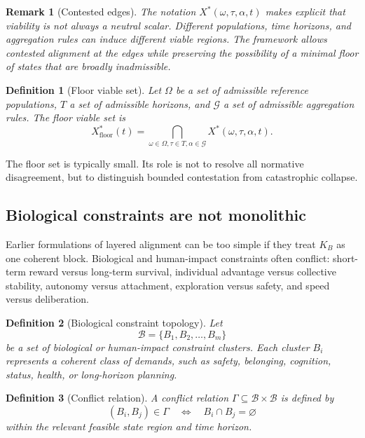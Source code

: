 \documentclass[11pt]{article}
\newtheorem{definition}{Definition}[section]
\newtheorem{remark}{Remark}[section]
\newcommand{\KB}{K_B}
\newcommand{\Xstar}{X^{\ast}}
\begin{document}
\begin{remark}[Contested edges]
The notation \(\Xstar(\omega,\tau,\alpha,t)\) makes explicit that viability is not always a neutral scalar. Different populations, time horizons, and aggregation rules can induce different viable regions. The framework allows contested alignment at the edges while preserving the possibility of a minimal floor of states that are broadly inadmissible.
\end{remark}

\begin{definition}[Floor viable set]
Let \(\Omega\) be a set of admissible reference populations, \(T\) a set of admissible horizons, and \(\mathcal{G}\) a set of admissible aggregation rules. The floor viable set is
\[
\Xstar_{\mathrm{floor}}(t) = \bigcap_{\omega\in\Omega,\tau\in T,\alpha\in\mathcal{G}} \Xstar(\omega,\tau,\alpha,t).
\]
\end{definition}

The floor set is typically small. Its role is not to resolve all normative disagreement, but to distinguish bounded contestation from catastrophic collapse.

\subsection{Biological constraints are not monolithic}

Earlier formulations of layered alignment can be too simple if they treat \(\KB\) as one coherent block. Biological and human-impact constraints often conflict: short-term reward versus long-term survival, individual advantage versus collective stability, autonomy versus attachment, exploration versus safety, and speed versus deliberation.

\begin{definition}[Biological constraint topology]
Let
\[
\mathcal{B}=\{B_1,B_2,\ldots,B_m\}
\]
be a set of biological or human-impact constraint clusters. Each cluster \(B_i\) represents a coherent class of demands, such as safety, belonging, cognition, status, health, or long-horizon planning.
\end{definition}

\begin{definition}[Conflict relation]
A conflict relation \(\Gamma\subseteq\mathcal{B}\times\mathcal{B}\) is defined by
\[
(B_i,B_j)\in\Gamma \quad \Longleftrightarrow \quad B_i\cap B_j=\varnothing
\]
within the relevant feasible state region and time horizon.
\end{definition}
\end{document}
